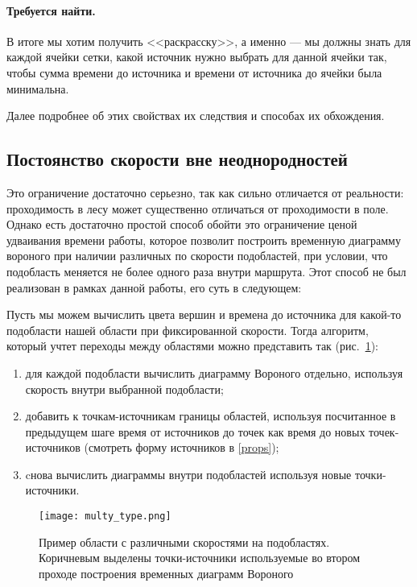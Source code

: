 \documentclass[12pt]{article}
\begin{document}
\paragraph{Требуется найти.}
В итоге мы хотим получить <<раскрасску>>, а именно --- мы должны знать для каждой ячейки сетки, какой источник нужно выбрать для данной ячейки так, чтобы сумма времени до источника и времени от источника до ячейки была минимальна.

Далее подробнее об этих свойствах их следствия и способах их обхождения.

\subsection{Постоянство скорости вне неоднородностей}
\label{multi_type}
Это ограничение достаточно серьезно, так как сильно отличается от реальности: проходимость в лесу может существенно отличаться от проходимости в поле. Однако есть достаточно простой способ обойти это ограничение ценой удваивания времени работы, которое позволит построить временную диаграмму вороного при наличии различных по скорости подобластей, при условии, что подобласть меняется не более одного раза внутри маршрута. Этот способ не был реализован в рамках данной работы, его суть в следующем:

Пусть мы можем вычислить цвета вершин и времена до источника для какой-то подобласти нашей области при фиксированной скорости. Тогда алгоритм, который учтет переходы между областями можно представить так (рис.~\ref{multi_type_fig}):
\begin{enumerate}
\item для каждой подобласти вычислить диаграмму Вороного отдельно, используя скорость внутри выбранной подобласти;
\item добавить к точкам-источникам границы областей, используя посчитанное в предыдущем шаге время от источников до точек как время до новых точек-источников (смотреть форму источников в \ref{props});
\item cнова вычислить диаграммы внутри подобластей используя новые точки-источники.
\end{enumerate}
\begin{figure}
\center\texttt{[image: multy\_type.png]}
\caption{Пример области с различными скоростями на подобластях. Коричневым выделены точки-источники используемые во втором проходе построения временных диаграмм Вороного}
\label{multi_type_fig}
\end{figure}
\end{document}
